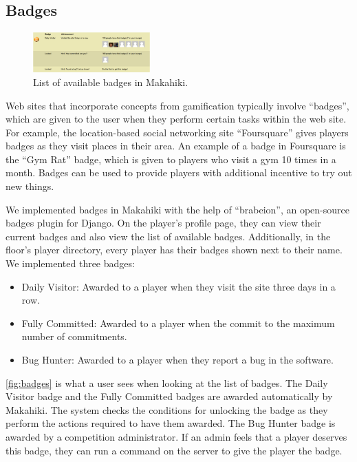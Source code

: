 \subsection{Badges}
\label{makahiki:components-badges}

\begin{figure}[h]
  \center
  \includegraphics[width=0.4\textwidth]{images/badges.eps}
  \caption{List of available badges in Makahiki.}
  \label{fig:badges}
\end{figure}

Web sites that incorporate concepts from gamification typically involve ``badges'', which are given to the user when they perform certain tasks within the web site. For example, the location-based social networking site ``Foursquare'' gives players badges as they visit places in their area. An example of a badge in Foursquare is the ``Gym Rat'' badge, which is given to players who visit a gym 10 times in a month. Badges can be used to provide players with additional incentive to try out new things. 

We implemented badges in Makahiki with the help of ``brabeion'', an open-source badges plugin for Django. On the player's profile page, they can view their current badges and also view the list of available badges. Additionally, in the floor's player directory, every player has their badges shown next to their name. We implemented three badges:

\begin{itemize}
    \item Daily Visitor: Awarded to a player when they visit the site three days in a row.
    \item Fully Committed: Awarded to a player when the commit to the maximum number of commitments.
    \item Bug Hunter: Awarded to a player when they report a bug in the software.
\end{itemize}

\autoref{fig:badges} is what a user sees when looking at the list of badges. The Daily Visitor badge and the Fully Committed badges are awarded automatically by Makahiki. The system checks the conditions for unlocking the badge as they perform the actions required to have them awarded. The Bug Hunter badge is awarded by a competition administrator. If an admin feels that a player deserves this badge, they can run a command on the server to give the player the badge.

